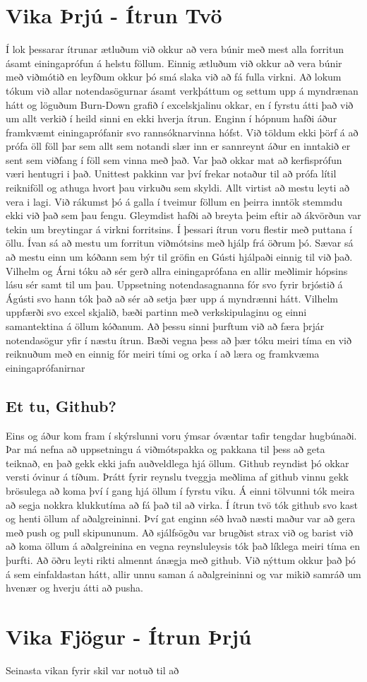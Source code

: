 \documentclass[a4paper, 12 pt]{article}
\begin{document}
\section{Vika Þrjú - Ítrun Tvö}
Í lok þessarar ítrunar ætluðum við okkur að vera búnir með mest alla forritun ásamt einingaprófun á helstu föllum.  Einnig ætluðum við okkur að vera búnir með viðmótið en leyfðum okkur þó smá slaka við að fá fulla virkni.  Að lokum tókum við allar notendasögurnar ásamt verkþáttum og settum upp á myndrænan hátt og löguðum Burn-Down grafið í excelskjalinu okkar, en í fyrstu átti það við um allt verkið í heild sinni en ekki hverja ítrun.   
Enginn í hópnum hafði áður framkvæmt einingaprófanir svo rannsóknarvinna hófst.  Við töldum ekki þörf á að prófa öll föll þar sem allt sem notandi slær inn er sannreynt áður en inntakið er sent sem viðfang í föll sem vinna með það.  Var það okkar mat að kerfisprófun væri hentugri i það.  Unittest pakkinn var því frekar notaður til að prófa lítil reikniföll og athuga hvort þau virkuðu sem skyldi.  Allt virtist að mestu leyti að vera i lagi.  Við rákumst þó á galla í tveimur föllum en þeirra inntök stemmdu ekki við það sem þau fengu.  Gleymdist hafði að breyta þeim eftir að ákvörðun var tekin um breytingar á virkni forritsins.  Í þessari ítrun voru flestir með puttana í öllu.  Ívan sá að mestu um forritun viðmótsins með hjálp frá öðrum þó.  Sævar sá að mestu einn um kóðann sem býr til gröfin en Gústi hjálpaði einnig til við það.  Vilhelm og Árni tóku að sér gerð allra einingaprófana en allir meðlimir hópsins lásu sér samt til um þau.  Uppsetning notendasagnanna fór svo fyrir brjóstið á Ágústi svo hann tók það að sér að setja þær upp á myndrænni hátt.  Vilhelm uppfærði svo excel skjalið, bæði partinn með verkskipulaginu og einni samantektina á öllum kóðanum.  
Að þessu sinni þurftum við að færa þrjár notendasögur yfir í næstu ítrun.  Bæði vegna þess að þær tóku meiri tíma en við reiknuðum með en einnig fór meiri tími og orka í að læra og framkvæma einingaprófanirnar

\subsection{Et tu, Github?}
Eins og áður kom fram í skýrslunni voru ýmsar óvæntar tafir tengdar hugbúnaði.  Þar má nefna að uppsetningu á viðmótspakka og pakkana til þess að geta teiknað, en það gekk ekki jafn auðveldlega hjá öllum.  Github reyndist þó okkar versti óvinur á tíðum.  Þrátt fyrir reynslu tveggja meðlima af github vinnu gekk brösulega að koma því í gang hjá öllum í fyrstu viku.  Á einni tölvunni tók meira að segja nokkra klukkutíma að fá það til að virka.  Í ítrun tvö tók github svo kast og henti öllum af aðalgreininni.  Því gat enginn séð hvað næsti maður var að gera með push og pull skipununum.  Að sjálfsögðu var brugðist strax við og barist við að koma öllum á aðalgreinina en vegna reynsluleysis tók það líklega meiri tíma en þurfti.  Að öðru leyti rikti almennt ánægja með github.  Við nýttum okkur það þó á sem einfaldastan hátt, allir unnu saman á aðalgreininni og var mikið samráð um hvenær og hverju átti að pusha.

\section{Vika Fjögur - Ítrun Þrjú}
Seinasta vikan fyrir skil var notuð til að 
\end{document}
